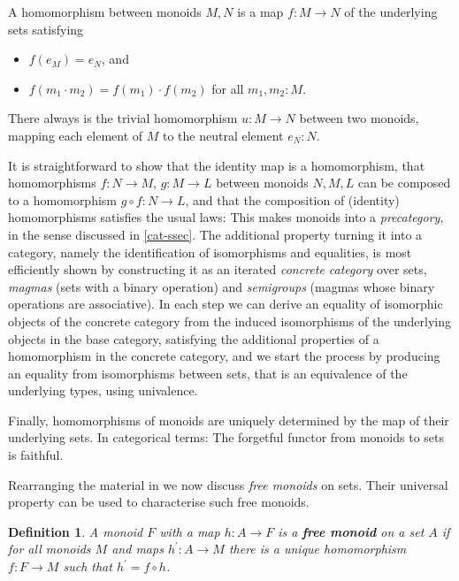 \documentclass{amsart}
\theoremstyle{plain}
\numberwithin{equation}{section} %
\numberwithin{figure}{section} %
\theoremstyle{plain}
\theoremstyle{plain}
\theoremstyle{plain}
\theoremstyle{plain}
\theoremstyle{plain}
\theoremstyle{plain}
\newtheorem{Def}[thm]{Definition} %
\theoremstyle{remark}
\theoremstyle{remark}
\theoremstyle{remark}
\begin{document}
A homomorphism between monoids $M, N$ is a map $f : M \rightarrow N$ of the underlying sets satisfying
\begin{itemize}
\item $f(e_M) = e_N$, and
\item $f(m_1 \cdot m_2) = f(m_1) \cdot f(m_2)$ for all $m_1, m_2 : M$.
\end{itemize}

There always is the trivial homomorphism $u : M \rightarrow N$ between two monoids, mapping each element of $M$ to the neutral element $e_N : N$.

It is straightforward to show that the identity map is a homomorphism, that homomorphisms $f : N \rightarrow M$, $g : M \rightarrow L$ between monoids $N, M, L$ can be composed to a homomorphism $g \circ f : N \rightarrow L$, and that the composition of (identity) homomorphisms satisfies the usual laws: This makes monoids into a \textit{precategory}, in the sense discussed in \ref{cat-ssec}. 
The additional property turning it into a category, namely the identification of isomorphisms and equalities, is most efficiently shown by constructing it as an iterated \textit{concrete category} over sets, \textit{magmas} (sets with a binary operation) and \textit{semigroups} (magmas whose binary operations are associative). In each step we can derive an equality of isomorphic objects of the concrete category from the induced isomorphisms of the underlying objects in the base category, satisfying the additional properties of a homomorphism in the concrete category, and we start the process by producing an equality from isomorphisms between sets, that is an equivalence of the underlying types, using univalence.

Finally, homomorphisms of monoids are uniquely determined by the map of their underlying sets. In categorical terms: The forgetful functor from monoids to sets is faithful.

Rearranging the material in \cite[6.11]{HoTTBook} we now discuss \textit{free monoids} on sets. Their universal property can be used to characterise such free monoids.

\begin{Def}  %
A monoid $F$ with a map $h : A \rightarrow F$ is a \textbf{free monoid} on a set $A$ if for all monoids $M$ and maps $h^\prime : A \rightarrow M$ there is a unique homomorphism $f : F \rightarrow M$ such that $h^\prime = f \circ h$.
\end{Def}
\end{document}
